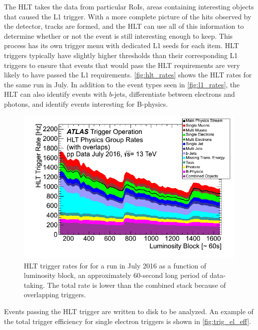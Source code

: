 The \ac{HLT} takes the data from particular \acp{RoI}, areas containing interesting objects that caused the \ac{L1} trigger. With a more complete picture of the hits observed by the detector, tracks are formed, and the \ac{HLT} can use all of this information to determine whether or not the event is still interesting enough to keep. This process has its own trigger menu with dedicated \ac{L1} seeds for each item. \ac{HLT} triggers typically have slightly higher thresholds than their corresponding \ac{L1} triggers to ensure that events that would pass the \ac{HLT} requirements are very likely to have passed the \ac{L1} requirements. \autoref{fig:hlt_rates} shows the \ac{HLT} rates for the same run in July. In addition to the event types seen in \autoref{fig:l1_rates}, the \ac{HLT} can also identify events with $b$-jets, differentiate between electrons and photons, and identify events interesting for B-physics. 

\begin{centering}
\begin{figure}[!hbt]
\myfloatalign
\includegraphics[width=.90\linewidth]{figures/atlas/Time_HLTGroupRate_Stack_2016_07.png}
\caption{\ac{HLT} trigger rates for for a run in July 2016 as a function of luminosity block, an approximately 60-second long period of data-taking. The total rate is lower than the combined stack because of overlapping triggers.}
\label{fig:hlt_rates}
\end{figure}
\end{centering}


Events passing the \ac{HLT} trigger are written to disk to be analyzed. An example of the total trigger efficiency for single electron triggers is shown in \autoref{fig:trig_el_eff}. %

